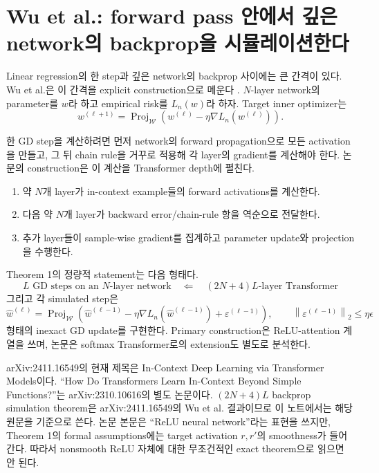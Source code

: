 \documentclass[11pt,a4paper,oneside,openany]{memoir}
\newcommand{\norm}[1]{\left\lVert #1\right\rVert}
\theoremstyle{definition}
\begin{document}
\section{Wu et al.: forward pass 안에서 깊은 network의 backprop을 시뮬레이션한다}

Linear regression의 한 step과 깊은 network의 backprop 사이에는 큰 간격이 있다. Wu et al.은 이 간격을 explicit construction으로 메운다 \cite{wu2025}. $N$-layer network의 parameter를 $w$라 하고 empirical risk를 $L_n(w)$라 하자. Target inner optimizer는
\[
w^{(\ell+1)}
=\operatorname{Proj}_{\mathcal W}
\left(w^{(\ell)}-\eta\nabla L_n(w^{(\ell)})\right).
\]

한 GD step을 계산하려면 먼저 network의 forward propagation으로 모든 activation을 만들고, 그 뒤 chain rule을 거꾸로 적용해 각 layer의 gradient를 계산해야 한다. 논문의 construction은 이 계산을 Transformer depth에 펼친다.

\begin{enumerate}
\item 약 $N$개 layer가 in-context example들의 forward activations를 계산한다.
\item 다음 약 $N$개 layer가 backward error/chain-rule 항을 역순으로 전달한다.
\item 추가 layer들이 sample-wise gradient를 집계하고 parameter update와 projection을 수행한다.
\end{enumerate}

Theorem 1의 정량적 statement는 다음 형태다.
\[
\boxed{
\text{$L$ GD steps on an $N$-layer network}
\quad\Longleftarrow\quad
(2N+4)L\text{-layer Transformer}}
\]
그리고 각 simulated step은
\[
\widehat w^{(\ell)}
=
\operatorname{Proj}_{\mathcal W}
\left(
\widehat w^{(\ell-1)}
-\eta\nabla L_n(\widehat w^{(\ell-1)})
+\varepsilon^{(\ell-1)}
\right),
\qquad
\norm{\varepsilon^{(\ell-1)}}_2\le \eta\epsilon
\]
형태의 inexact GD update를 구현한다. Primary construction은 ReLU-attention 계열을 쓰며, 논문은 softmax Transformer로의 extension도 별도로 분석한다.

\begin{warningbox}
arXiv:2411.16549의 현재 제목은 In-Context Deep Learning via Transformer Models이다. ``How Do Transformers Learn In-Context Beyond Simple Functions?''는 arXiv:2310.10616의 별도 논문이다. $(2N+4)L$ backprop simulation theorem은 arXiv:2411.16549의 Wu et al. 결과이므로 이 노트에서는 해당 원문을 기준으로 쓴다. 논문 본문은 ``ReLU neural network''라는 표현을 쓰지만, Theorem 1의 formal assumptions에는 target activation $r,r'$의 smoothness가 들어간다. 따라서 nonsmooth ReLU 자체에 대한 무조건적인 exact theorem으로 읽으면 안 된다.
\end{warningbox}
\end{document}
